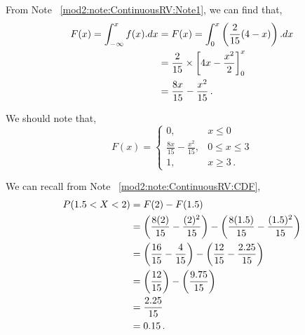 \begin{subquestions}
\begin{subsubquestions}
From Note ~\ref{mod2:note:ContinuousRV:Note1}, we can find that,
\begin{align}
	F(x) = \int_{-\infty}^{x} f(x).dx & = F(x) = \int_{0}^{x}\left( \frac{2}{15}(4-x)\right).dx \nonumber \\
	                                  & = \frac{2}{15} \times \left[4x - \frac{x^2}{2} \right]^x_0 \nonumber \\
	                                  & = \frac{8x}{15} - \frac{x^2}{15} \,.
\end{align}

We should note that,
\[ F(x) =
\begin{cases} 
	0, & x \leq 0 \\
	\frac{8x}{15} - \frac{x^2}{15}, & 0 \leq x \leq 3 \\
	1, & x \geq 3 \,.
\end{cases}
\]


\subsubquestion

We can recall from Note ~\ref{mod2:note:ContinuousRV:CDF}, 
\begin{align}
		P( 1.5 < X < 2) & = F(2) - F(1.5) \nonumber \\
		                & = \left(\frac{8(2)}{15} - \frac{(2)^2}{15}\right) - \left(\frac{8(1.5)}{15} - \frac{(1.5)^2}{15}\right) \nonumber \\
		                & = \left(\frac{16}{15} - \frac{4}{15}\right) - \left(\frac{12}{15} - \frac{2.25}{15}\right) \nonumber \\
		                & = \left(\frac{12}{15}\right) - \left(\frac{9.75}{15} \right) \nonumber \\
		                & = \frac{2.25}{15} \nonumber \\
		                & = 0.15 \,.
\end{align}

\end{subsubquestions}
	
	
\end{subquestions}

